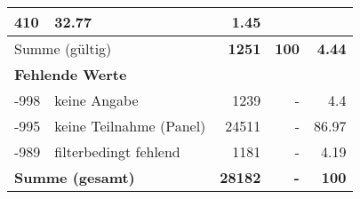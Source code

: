 \begin{longtable}{lXrrr}
       \num{410} &
       \num[round-mode=places,round-precision=2]{32.77} &
         \num[round-mode=places,round-precision=2]{1.45} \\
     \midrule
     \multicolumn{2}{l}{Summe (gültig)} &
       \textbf{\num{1251}} &
     \textbf{100} &
       \textbf{\num[round-mode=places,round-precision=2]{4.44}} \\
     \multicolumn{5}{l}{\textbf{Fehlende Werte}}\\
       -998 &
       keine Angabe &
         \num{1239} &
        - &
         \num[round-mode=places,round-precision=2]{4.4} \\
       -995 &
       keine Teilnahme (Panel) &
         \num{24511} &
        - &
         \num[round-mode=places,round-precision=2]{86.97} \\
       -989 &
       filterbedingt fehlend &
         \num{1181} &
        - &
         \num[round-mode=places,round-precision=2]{4.19} \\
     \midrule
     \multicolumn{2}{l}{\textbf{Summe (gesamt)}} &
          \textbf{\num{28182}} &
        \textbf{-} &
        \textbf{100} \\
     \bottomrule
     \end{longtable}
     

